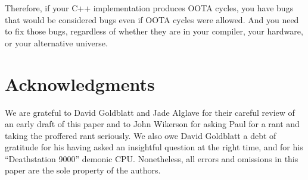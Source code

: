 \documentclass[10]{article}
\begin{document}
Therefore, if your C++ implementation produces OOTA cycles, you have
bugs that would be considered bugs even if OOTA cycles were allowed.
And you need to fix those bugs, regardless of whether they are in your
compiler, your hardware, or your alternative universe.

\section{Acknowledgments}
\label{sec:Acknowledgments}

We are grateful to David Goldblatt and Jade Alglave for their careful
review of an early draft of this paper and to John Wikerson for asking
Paul for a rant and taking the proffered rant seriously.
We also owe David Goldblatt a debt of gratitude for his having asked an
insightful question at the right time, and for his ``Deathstation 9000''
demonic CPU.
Nonetheless, all errors and omissions in this paper are the sole property
of the authors.



\end{document}
